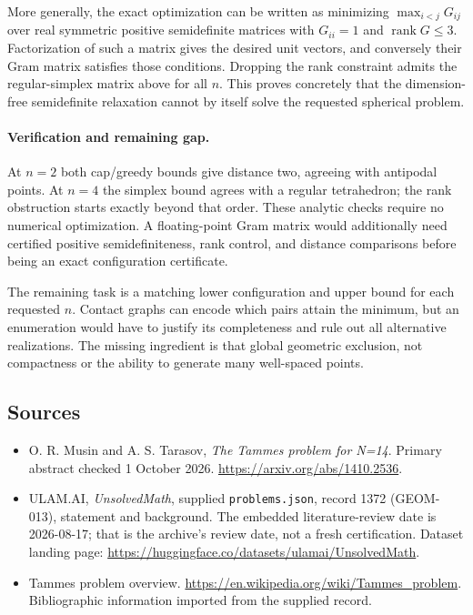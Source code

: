 \documentclass[11pt,a4paper]{article}
\begin{document}
More generally, the exact optimization can be written as minimizing $\max_{i<j}G_{ij}$ over real symmetric positive semidefinite matrices with $G_{ii}=1$ and $\operatorname{rank}G\le3$. Factorization of such a matrix gives the desired unit vectors, and conversely their Gram matrix satisfies those conditions. Dropping the rank constraint admits the regular-simplex matrix above for all $n$. This proves concretely that the dimension-free semidefinite relaxation cannot by itself solve the requested spherical problem.

\paragraph{Verification and remaining gap.}
At $n=2$ both cap/greedy bounds give distance two, agreeing with antipodal points. At $n=4$ the simplex bound agrees with a regular tetrahedron; the rank obstruction starts exactly beyond that order. These analytic checks require no numerical optimization. A floating-point Gram matrix would additionally need certified positive semidefiniteness, rank control, and distance comparisons before being an exact configuration certificate.

The remaining task is a matching lower configuration and upper bound for each requested $n$. Contact graphs can encode which pairs attain the minimum, but an enumeration would have to justify its completeness and rule out all alternative realizations. The missing ingredient is that global geometric exclusion, not compactness or the ability to generate many well-spaced points.

\subsection{Sources}

{\small

\begin{itemize}
\item[E1] O. R. Musin and A. S. Tarasov, \emph{The Tammes problem for N=14}. Primary abstract checked 1 October 2026. \url{https://arxiv.org/abs/1410.2536}.


\item[\hypertarget{source:1372:1}{S1}] ULAM.AI, \emph{UnsolvedMath}, supplied \texttt{problems.json}, record 1372 (GEOM-013), statement and background. The embedded literature-review date is 2026-08-17; that is the archive’s review date, not a fresh certification. Dataset landing page: \url{https://huggingface.co/datasets/ulamai/UnsolvedMath}.

\item[\hypertarget{source:1372:2}{S2}] Tammes problem overview. \url{https://en.wikipedia.org/wiki/Tammes_problem}. Bibliographic information imported from the supplied record.

\end{itemize}

}

\label{end:1372}
\end{document}
